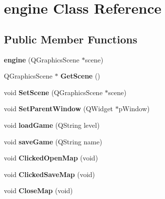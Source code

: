 \hypertarget{classengine}{\section{engine Class Reference}
\label{classengine}
}
\subsection*{Public Member Functions}
\begin{DoxyCompactItemize}
\item 
\hypertarget{classengine_a5fc1dc660b130df073d776e17f443ef5}{{\bfseries engine} (Q\-Graphics\-Scene $\ast$scene)}\label{classengine_a5fc1dc660b130df073d776e17f443ef5}

\item 
\hypertarget{classengine_aeaac5db377f37a85bfae53711e8248c0}{Q\-Graphics\-Scene $\ast$ {\bfseries Get\-Scene} ()}\label{classengine_aeaac5db377f37a85bfae53711e8248c0}

\item 
\hypertarget{classengine_a0421c21bd062075ab965333e05f20626}{void {\bfseries Set\-Scene} (Q\-Graphics\-Scene $\ast$scene)}\label{classengine_a0421c21bd062075ab965333e05f20626}

\item 
\hypertarget{classengine_ad0d2625e9b6f5b9ed18df6076001ea73}{void {\bfseries Set\-Parent\-Window} (Q\-Widget $\ast$p\-Window)}\label{classengine_ad0d2625e9b6f5b9ed18df6076001ea73}

\item 
\hypertarget{classengine_a4e8515e2f893531685ab028f42567137}{void {\bfseries load\-Game} (Q\-String level)}\label{classengine_a4e8515e2f893531685ab028f42567137}

\item 
\hypertarget{classengine_a6e3fca96515e269117b4cc46750f363e}{void {\bfseries save\-Game} (Q\-String name)}\label{classengine_a6e3fca96515e269117b4cc46750f363e}

\item 
\hypertarget{classengine_a02ad5e7f4d1073a97f77d153c9685ff8}{void {\bfseries Clicked\-Open\-Map} (void)}\label{classengine_a02ad5e7f4d1073a97f77d153c9685ff8}

\item 
\hypertarget{classengine_ae322ec44826013a47ac954f9b8fc24b2}{void {\bfseries Clicked\-Save\-Map} (void)}\label{classengine_ae322ec44826013a47ac954f9b8fc24b2}

\item 
\hypertarget{classengine_a68b46ec574d97c62f29206fd201b34b5}{void {\bfseries Close\-Map} (void)}\label{classengine_a68b46ec574d97c62f29206fd201b34b5}


\end{DoxyCompactItemize}
